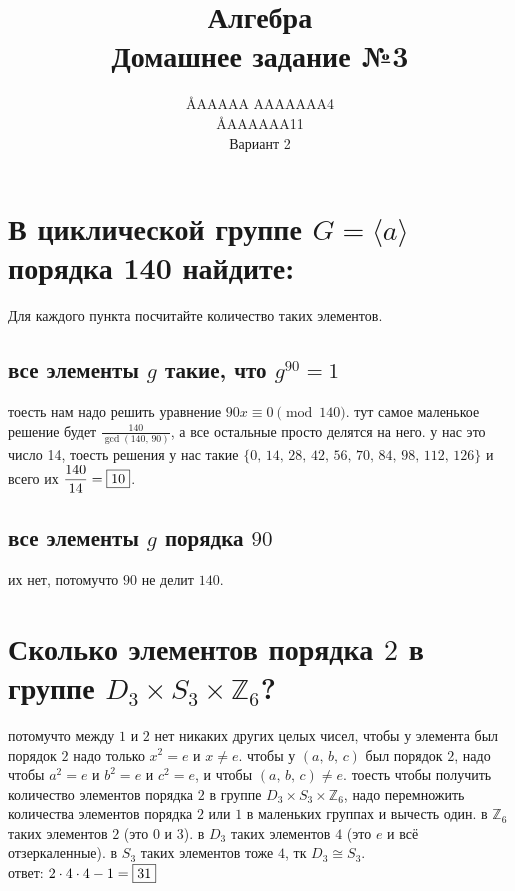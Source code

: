 \documentclass{article}
\title{Алгебра \\ Домашнее задание №3}
\author{\AA{AAAAA AAAAAAA}{4} \\ \AA{AAAAAA}{11} \\ Вариант 2}
\newcommand{\ds}{\displaystyle}
\newcommand{\Z}{\mathbb{Z}}
\renewcommand{\f}{\frac}
\begin{document}
  \maketitle

  \section{В циклической группе $G = \langle a \rangle$ порядка 140 найдите:}
  Для каждого пункта посчитайте количество таких элементов.
  \subsection{все элементы $g$ такие, что $g^{90} = 1$}
  тоесть нам надо решить уравнение $90x \equiv 0 \pmod{140}$.
  тут самое маленькое решение будет $\ds\f{140}{\gcd(140,\,90)}$,
  а все остальные просто делятся на него.
  у нас это число 14, тоесть решения у нас такие $\{0,\,14,\,28,\,42,\,56,\,70,\,84,\,98,\,112,\,126\}$
  и всего их $\ds \f{140}{14} = \fbox{10}$.
  \subsection{все элементы $g$ порядка $90$}
  их нет, потомучто $90$ не делит $140$.

  \section{Сколько элементов порядка $2$ в группе $D_3 \times S_3 \times \Z_6$?}
  потомучто между $1$ и $2$ нет никаких других целых чисел,
  чтобы у элемента был порядок $2$ надо только $x^2 = e$ и $x \neq e$.
  чтобы у $(a,\, b,\, c)$ был порядок $2$, надо чтобы $a^2 = e$ и $b^2 = e$ и $c^2 = e$, и чтобы $(a,\, b,\, c) \neq e$.
  тоесть чтобы получить количество элементов порядка $2$ в группе $D_3 \times S_3 \times \Z_6$,
  надо перемножить количества элементов порядка $2$ или $1$ в маленьких группах и вычесть один.
  в $\Z_6$ таких элементов $2$ (это $0$ и $3$).
  в $D_3$ таких элементов $4$ (это $e$ и всё отзеркаленные).
  в $S_3$ таких элементов тоже $4$, тк $D_3 \cong S_3$.
  \\ ответ: $2 \cdot 4 \cdot 4 - 1 = \fbox{31}$
\end{document}
